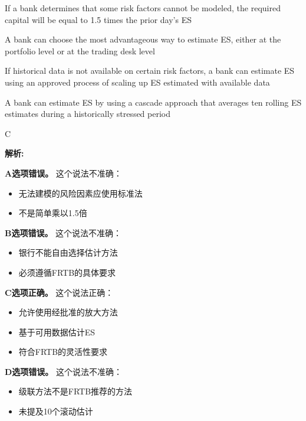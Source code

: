 \documentclass{article}
\newenvironment{explanation}
{\textbf{解析:}\par}
{\par}
\begin{document}
\begin{choices}
    \item If a bank determines that some risk factors cannot be modeled, the required capital will be equal to 1.5 times the prior day's ES
    \item A bank can choose the most advantageous way to estimate ES, either at the portfolio level or at the trading desk level
    \item If historical data is not available on certain risk factors, a bank can estimate ES using an approved process of scaling up ES estimated with available data
    \item A bank can estimate ES by using a cascade approach that averages ten rolling ES estimates during a historically stressed period
\end{choices}

\begin{correctanswer}
    C
\end{correctanswer}

\begin{explanation}
    \textbf{A选项错误。}
    这个说法不准确：
    \begin{itemize}
        \item 无法建模的风险因素应使用标准法
        \item 不是简单乘以1.5倍
    \end{itemize}

    \textbf{B选项错误。}
    这个说法不准确：
    \begin{itemize}
        \item 银行不能自由选择估计方法
        \item 必须遵循FRTB的具体要求
    \end{itemize}

    \textbf{C选项正确。}
    这个说法正确：
    \begin{itemize}
        \item 允许使用经批准的放大方法
        \item 基于可用数据估计ES
        \item 符合FRTB的灵活性要求
    \end{itemize}

    \textbf{D选项错误。}
    这个说法不准确：
    \begin{itemize}
        \item 级联方法不是FRTB推荐的方法
        \item 未提及10个滚动估计
    \end{itemize}
\end{explanation}
\end{document}

